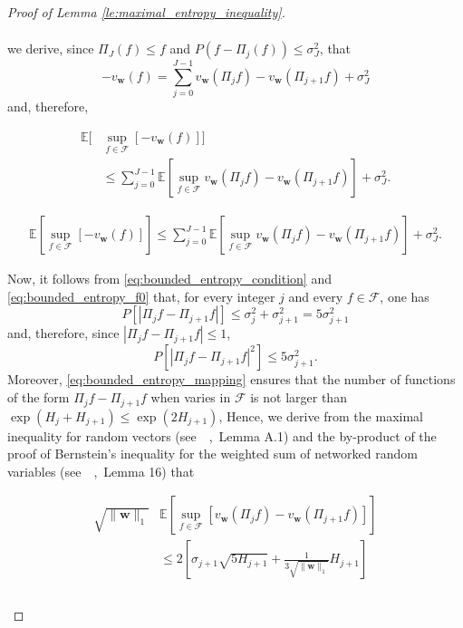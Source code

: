 \documentclass[letterpaper]{article} %
\def\DoubleColumn{}
\def\DoubleColumnEnd{}
\def\SingleColumn{}
\def\SingleColumnEnd{}
\newcommand{\E}{\mathbb{E}}
\newcommand{\weight}{\mathbf{w}}
\newcommand{\normo}[1]{\|#1\|_1}
\newcommand{\citep}[3]{(#1\ \citeauthor{#3}\ \citeyear{#3},\ #2)}
\begin{document}
\begin{proof}[Proof of Lemma \ref{le:maximal_entropy_inequality}]
\begin{align*}
    \end{align*}
    \SingleColumnEnd
    we derive, since $\Pi_J(f)\le f$ and $P(f-\Pi_j(f))\le \sigma_J^2$, that
    \[-v_\weight(f)=\sum_{j=0}^{J-1}v_\weight(\Pi_jf)-v_\weight(\Pi_{j+1}f)+\sigma_J^2\]
    and, therefore,
    \DoubleColumn
    \begin{equation}
        \begin{aligned}
            \label{eq:bounded_entropy_decomposition}
            \E[&\sup_{f\in\mathcal{F}}[-v_\weight(f)]]\\
            &\le \sum_{j=0}^{J-1}\E[\sup_{f\in\mathcal{F}}v_\weight(\Pi_jf)-v_\weight(\Pi_{j+1}f)]+\sigma_J^2.
        \end{aligned}
    \end{equation}
    \DoubleColumnEnd
    \SingleColumn
    \begin{equation}
        \begin{aligned}
            \label{eq:bounded_entropy_decomposition}
            \E[\sup_{f\in\mathcal{F}}[-v_\weight(f)]]\le \sum_{j=0}^{J-1}\E[\sup_{f\in\mathcal{F}}v_\weight(\Pi_jf)-v_\weight(\Pi_{j+1}f)]+\sigma_J^2.
        \end{aligned}
    \end{equation}
    \SingleColumnEnd
    Now, it follows from \eqref{eq:bounded_entropy_condition} and \eqref{eq:bounded_entropy_f0} that, for every integer $j$ and every $f\in\mathcal{F}$, one has
    \[P[|\Pi_jf-\Pi_{j+1}f|]\le \sigma_j^2+\sigma_{j+1}^2=5\sigma_{j+1}^2\]
    and, therefore, since $|\Pi_jf-\Pi_{j+1}f|\le 1$,
    \[P[|\Pi_jf-\Pi_{j+1}f|^2]\le 5\sigma_{j+1}^2.\]
    Moreover, \eqref{eq:bounded_entropy_mapping} ensures that the number of functions of the form $\Pi_jf-\Pi_{j+1}f$ when varies in $\mathcal{F}$ is not larger than $\exp(H_j+H_{j+1})\le \exp(2H_{j+1})$, Hence, we derive from the maximal inequality for random vectors \citep{see}{Lemma A.1}{Massart2006} and the by-product of the proof of Bernstein's inequality for the weighted sum of networked random variables \citep{see}{Lemma 16}{wang2017learning} that
    \DoubleColumn
    \begin{align*}
        \sqrt{\normo{\weight{}}}&\E[\sup_{f\in\mathcal{F}}[v_\weight(\Pi_jf)-v_\weight(\Pi_{j+1}f)]]\\
        &\le 2[\sigma_{j+1}\sqrt{5H_{j+1}}+\frac{1}{3\sqrt{\normo{\weight{}}}}H_{j+1}]\\
    \end{align*}
    \DoubleColumnEnd
    \SingleColumn
    \begin{align*}

\end{align*}
\end{proof}
\end{document}
